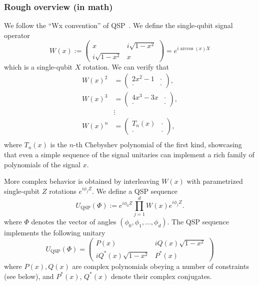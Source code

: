 \begin{refsection}
\subsubsection*{Rough overview (in math)}
We follow the ``Wx convention'' of QSP~\cite{gilyen2018QSingValTransf,martyn2021GrandUnificationQAlgs}. We define the single-qubit signal operator
\begin{equation}
    W(x) := \begin{pmatrix} x & i \sqrt{1-x^2} \\ i \sqrt{1-x^2} & x \end{pmatrix} = e^{i \arccos(x) X}
\end{equation}
which is a single-qubit $X$ rotation. We can verify that
\begin{align}
    W(x)^2 &= \begin{pmatrix} 2x^2 - 1 & \cdot \\ \cdot & \cdot \end{pmatrix}, \\
    W(x)^3 &= \begin{pmatrix} 4x^3 - 3x & \cdot \\ \cdot & \cdot \end{pmatrix}, \\
    &\vdots \\
    W(x)^n &= \begin{pmatrix} T_n(x) & \cdot \\ \cdot & \cdot \end{pmatrix}, \\
\end{align}
where $T_n(x)$ is the $n$-th Chebyshev polynomial of the first kind, showcasing that even a simple sequence of the signal unitaries can implement a rich family of polynomials of the signal $x$.

More complex behavior is obtained by interleaving $W(x)$ with parametrized single-qubit $Z$ rotations $e^{i \phi_j Z}$. We define a QSP sequence
\begin{equation}
    U_{\mathrm{QSP}}(\Phi) := e^{i \phi_0 Z} \prod_{j=1}^d W(x) e^{i \phi_j Z}.
\end{equation}
where $\Phi$ denotes the vector of angles $(\phi_0,\phi_1,\ldots,\phi_d)$. 
The QSP sequence implements the following unitary
\begin{equation}\label{eq:UQSP(Phi)}
    U_{\mathrm{QSP}}(\Phi) = \begin{pmatrix} P(x) & i Q(x) \sqrt{1-x^2} \\ i Q^*(x) \sqrt{1-x^2} & P^*(x) \end{pmatrix}
\end{equation}
where $P(x), Q(x)$ are complex polynomials obeying a number of constraints (see below), and $P^*(x)$, $Q^*(x)$ denote their complex conjugates. 


\end{refsection}
